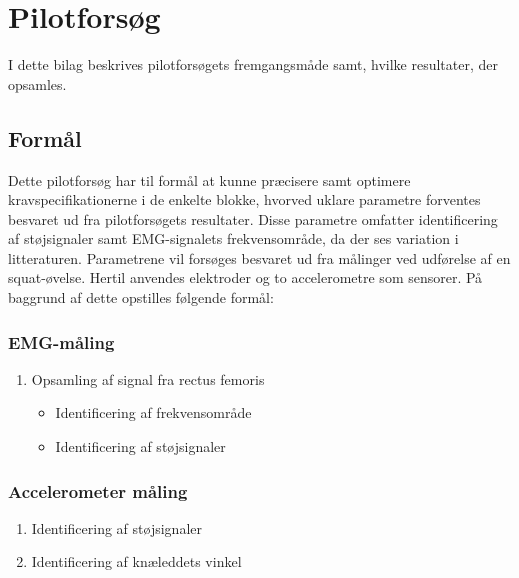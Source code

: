 \section{Pilotforsøg} \label{sec:pilotforsoeg}
I dette bilag beskrives pilotforsøgets fremgangsmåde samt, hvilke resultater, der opsamles. 

\subsection{Formål}
Dette pilotforsøg har til formål at kunne præcisere samt optimere kravspecifikationerne i de enkelte blokke, hvorved uklare parametre forventes besvaret ud fra pilotforsøgets resultater. Disse parametre omfatter identificering af støjsignaler samt EMG-signalets frekvensområde, da der ses variation i litteraturen. Parametrene vil forsøges besvaret ud fra målinger ved udførelse af en squat-øvelse.
Hertil anvendes elektroder og to accelerometre som sensorer. På baggrund af dette opstilles følgende formål:  

\subsubsection{EMG-måling}
\begin{enumerate}
\item Opsamling af signal fra rectus femoris %
	\begin{itemize}
	\item Identificering af frekvensområde
	\item Identificering af støjsignaler 
	\end{itemize}
\end{enumerate}

\subsubsection{Accelerometer måling}
\begin{enumerate}
\item Identificering af støjsignaler 
\item Identificering af knæleddets vinkel
\end{enumerate}

